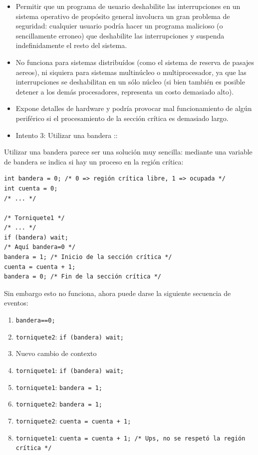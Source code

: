\documentclass[11pt,fleqn]{book} %
\begin{document}
\begin{itemize}
\item Permitir que un programa de usuario deshabilite las interrupciones
    en un sistema operativo de propósito general involucra un gran
    problema de seguridad: cualquier usuario podría hacer un programa
    malicioso (o sencillamente erroneo) que deshabilite las
    interrupciones y suspenda indefinidamente el resto del sistema.
\item No funciona para sistemas distribuídos (como el sistema de reserva
    de pasajes aereos), ni siquiera para sistemas multinúcleo o
    multiprocesador, ya que las interrupciones se deshabilitan en un
    sólo núcleo (si bien también es posible detener a los demás
    procesadores, representa un costo demasiado alto).
\item Expone detalles de hardware y podría provocar mal funcionamiento de
    algún periférico si el procesamiento de la sección crítica es
    demasiado largo.
\item Intento 3: Utilizar una bandera ::
\end{itemize}
  Utilizar una bandera parece ser una solución muy sencilla: mediante
  una variable de bandera se indica si hay un proceso en la región crítica:


\begin{verbatim}
int bandera = 0; /* 0 => región crítica libre, 1 => ocupada */
int cuenta = 0;
/* ... */

/* Torniquete1 */
/* ... */
if (bandera) wait;
/* Aquí bandera=0 */
bandera = 1; /* Inicio de la sección crítica */
cuenta = cuenta + 1;
bandera = 0; /* Fin de la sección crítica */
\end{verbatim}

  Sin embargo esto no funciona, ahora puede darse la siguiente secuencia
  de eventos:

\begin{enumerate}
\item \texttt{bandera==0;}
\item \texttt{torniquete2}: \texttt{if (bandera) wait;}
\item Nuevo cambio de contexto
\item \texttt{torniquete1}: \texttt{if (bandera) wait;}
\item \texttt{torniquete1}: \texttt{bandera = 1;}
\item \texttt{torniquete2}: \texttt{bandera = 1;}
\item \texttt{torniquete2}: \texttt{cuenta = cuenta + 1;}
\item \texttt{torniquete1}: \texttt{cuenta = cuenta + 1; /* Ups, no se respetó la región crítica */}
\end{enumerate}
\end{document}
